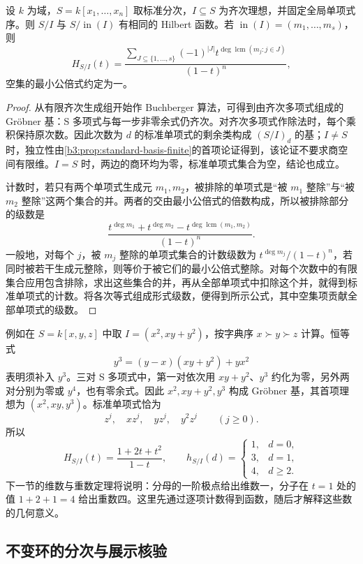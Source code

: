 \begin{proposition}\label{b3:prop:hilbert-initial-count}
	设 \(k\) 为域，\(S=k[x_1,\ldots,x_n]\) 取标准分次，\(I\subseteq S\) 为齐次理想，并固定全局单项式序。则 \(S/I\) 与 \(S/\operatorname{in}(I)\) 有相同的 Hilbert 函数。若 \(\operatorname{in}(I)=(m_1,\ldots,m_s)\)，则
	\[
		H_{S/I}(t)=\dfrac{\displaystyle\sum_{J\subseteq\{1,\ldots,s\}} (-1)^{|J|}t^{\deg\operatorname{lcm}(m_j:j\in J)}}{(1-t)^n},
	\]
	空集的最小公倍式约定为一。
\end{proposition}
\begin{proof}
	从有限齐次生成组开始作 Buchberger 算法，可得到由齐次多项式组成的 Gröbner 基：S 多项式与每一步非零余式仍齐次。对齐次多项式作除法时，每个乘积保持原次数。因此次数为 \(d\) 的标准单项式的剩余类构成 \((S/I)_d\) 的基；\(I\ne S\) 时，独立性由\cref{b3:prop:standard-basis-finite}的首项论证得到，该论证不要求商空间有限维。\(I=S\) 时，两边的商环均为零，标准单项式集合为空，结论也成立。

	计数时，若只有两个单项式生成元 \(m_1,m_2\)，被排除的单项式是“被 \(m_1\) 整除”与“被 \(m_2\) 整除”这两个集合的并。两者的交由最小公倍式的倍数构成，所以被排除部分的级数是
	\[
		\dfrac{t^{\deg m_1}+t^{\deg m_2}-t^{\deg\operatorname{lcm}(m_1,m_2)}}{(1-t)^n}.
	\]
	一般地，对每个 \(j\)，被 \(m_j\) 整除的单项式集合的计数级数为 \(t^{\deg m_j}/(1-t)^n\)，若同时被若干生成元整除，则等价于被它们的最小公倍式整除。对每个次数中的有限集合应用包含排除，求出这些集合的并，再从全部单项式中扣除这个并，就得到标准单项式的计数。将各次等式组成形式级数，便得到所示公式，其中空集项贡献全部单项式的级数。
\end{proof}

例如在 \(S=k[x,y,z]\) 中取 \(I=(x^2,xy+y^2)\)，按字典序 \(x\succ y\succ z\) 计算。恒等式
\[
	y^3=(y-x)(xy+y^2)+yx^2
\]
表明须补入 \(y^3\)。三对 S 多项式中，第一对依次用 \(xy+y^2\)、\(y^3\) 约化为零，另外两对分别为零或 \(y^4\)，也有零余式。因此 \(x^2,xy+y^2,y^3\) 构成 Gröbner 基，其首项理想为 \((x^2,xy,y^3)\)。标准单项式恰为
\[
	z^j,\quad xz^j,\quad yz^j,\quad y^2z^j\qquad(j\ge0).
\]
所以
\[
	H_{S/I}(t)=\dfrac{1+2t+t^2}{1-t},\qquad
	h_{S/I}(d)=\begin{cases}1,&d=0,\\3,&d=1,\\4,&d\ge2.\end{cases}
\]
下一节的维数与重数定理将说明：分母的一阶极点给出维数一，分子在 \(t=1\) 处的值 \(1+2+1=4\) 给出重数四。这里先通过逐项计数得到函数，随后才解释这些数的几何意义。

\subsection{不变环的分次与展示核验}
\label{b3:subsec:1102:invariant-hilbert}

